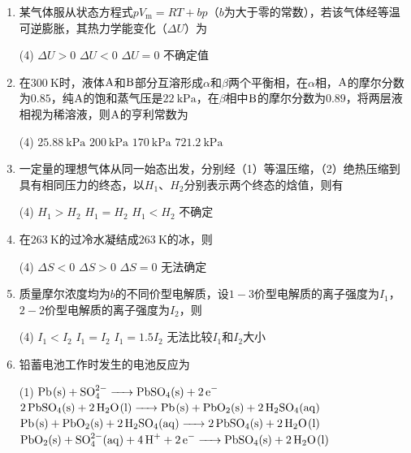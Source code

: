 \begin{enumerate}[label=\arabic*., itemsep=1.5ex]
    \item 某气体服从状态方程式$pV_\mathrm{m}=RT+bp$（$b$为大于零的常数），若该气体经等温可逆膨胀，其热力学能变化（$\Delta U$）为
    \begin{tasks}(4)
        \task $\Delta U>0$
        \task $\Delta U<0$
        \task $\Delta U=0$
        \task 不确定值
    \end{tasks}
    \item 在$300\ \mathrm{K}$时，液体$\ce{A}$和$\ce{B}$部分互溶形成$\alpha$和$\beta$两个平衡相，在$\alpha$相，$\ce{A}$的摩尔分数为$0.85$，纯$\ce{A}$的饱和蒸气压是$22\ \mathrm{kPa}$，在$\beta$相中$\ce{B}$的摩尔分数为$0.89$，将两层液相视为稀溶液，则$\ce{A}$的亨利常数为
    \begin{tasks}(4)
        \task $25.88\ \mathrm{kPa}$
        \task $200\ \mathrm{kPa}$
        \task $170\ \mathrm{kPa}$
        \task $721.2\ \mathrm{kPa}$
    \end{tasks}
    \item 一定量的理想气体从同一始态出发，分别经（1）等温压缩，（2）绝热压缩到具有相同压力的终态，以$H_1$、$H_2$分别表示两个终态的焓值，则有
    \begin{tasks}(4)
        \task $H_1>H_2$
        \task $H_1=H_2$
        \task $H_1<H_2$
        \task 不确定
    \end{tasks}
    \item 在$263\ \mathrm{K}$的过冷水凝结成$263\ \mathrm{K}$的冰，则
    \begin{tasks}(4)
        \task $\Delta S<0$
        \task $\Delta S>0$
        \task $\Delta S=0$
        \task 无法确定
    \end{tasks}
    \item 质量摩尔浓度均为$b$的不同价型电解质，设$1-3$价型电解质的离子强度为$I_1$，$2-2$价型电解质的离子强度为$I_2$，则
    \begin{tasks}(4)
        \task $I_1<I_2$
        \task $I_1=I_2$
        \task $I_1=1.5I_2$
        \task 无法比较$I_1$和$I_2$大小
    \end{tasks}
    \item 铅蓄电池工作时发生的电池反应为
    \begin{tasks}(1)
        \task $\ce{Pb(s) + SO^{2-}_{4} -> PbSO_{4}(s) + 2e^{-}}$
        \task $\ce{2PbSO_{4}(s) + 2H_{2}O(l) -> Pb(s) + PbO_{2}(s) + 2H_{2}SO_{4}(aq)}$
        \task $\ce{Pb(s) + PbO_{2}(s) + 2H_{2}SO_{4}(aq) -> 2PbSO_{4}(s) + 2H_{2}O(l)}$
        \task $\ce{PbO_{2}(s) + SO^{2-}_{4}(aq) + 4H^{+} + 2e^{-} -> PbSO_{4}(s) + 2H_{2}O(l)}$

\end{tasks}
\end{enumerate}
